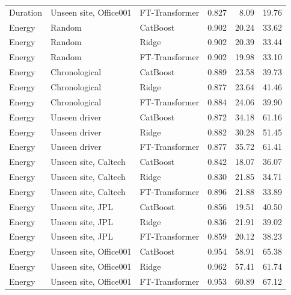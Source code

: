 {\begin{longtable}{lllrrr}
Duration & Unseen site, Office001 & FT-Transformer & 0.827 & 8.09 & 19.76 \\
Energy & Random & CatBoost & 0.902 & 20.24 & 33.62 \\
Energy & Random & Ridge & 0.902 & 20.39 & 33.44 \\
Energy & Random & FT-Transformer & 0.902 & 19.98 & 33.10 \\
Energy & Chronological & CatBoost & 0.889 & 23.58 & 39.73 \\
Energy & Chronological & Ridge & 0.877 & 23.64 & 41.46 \\
Energy & Chronological & FT-Transformer & 0.884 & 24.06 & 39.90 \\
Energy & Unseen driver & CatBoost & 0.872 & 34.18 & 61.16 \\
Energy & Unseen driver & Ridge & 0.882 & 30.28 & 51.45 \\
Energy & Unseen driver & FT-Transformer & 0.877 & 35.72 & 61.41 \\
Energy & Unseen site, Caltech & CatBoost & 0.842 & 18.07 & 36.07 \\
Energy & Unseen site, Caltech & Ridge & 0.830 & 21.85 & 34.71 \\
Energy & Unseen site, Caltech & FT-Transformer & 0.896 & 21.88 & 33.89 \\
Energy & Unseen site, JPL & CatBoost & 0.856 & 19.51 & 40.50 \\
Energy & Unseen site, JPL & Ridge & 0.836 & 21.91 & 39.02 \\
Energy & Unseen site, JPL & FT-Transformer & 0.859 & 20.12 & 38.23 \\
Energy & Unseen site, Office001 & CatBoost & 0.954 & 58.91 & 65.38 \\
Energy & Unseen site, Office001 & Ridge & 0.962 & 57.41 & 61.74 \\
Energy & Unseen site, Office001 & FT-Transformer & 0.953 & 60.89 & 67.12 \\
\end{longtable}}

